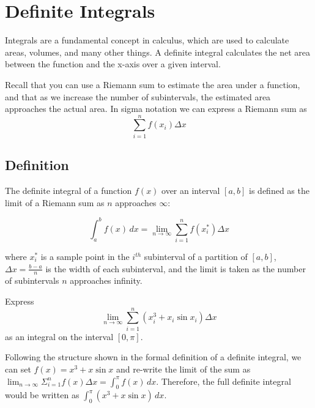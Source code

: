 \chapter{Definite Integrals}

Integrals are a fundamental concept in calculus, which are used to
calculate areas, volumes, and many other things. A definite integral
calculates the net area between the function and the x-axis over a
given interval.

Recall that you can use a Riemann sum to estimate the area under a 
function, and that as we increase the number of subintervals, the 
estimated area approaches the actual area. In sigma notation we can 
express a Riemann sum as $$\sum_{i=1}^{n} f(x_i)\Delta x$$

\section{Definition}

The definite integral of a function $f(x)$ over an interval $[a, b]$
is defined as the limit of a Riemann sum as $n$ approaches $\infty$:

\begin{equation}
\int_{a}^{b} f(x) \, dx = \lim_{{n \to \infty}} \sum_{i=1}^{n} 
f(x_i^*) \Delta x
\end{equation}

where $x_i^*$ is a sample point in the $i^{th}$ subinterval of a
partition of $[a, b]$, $\Delta x = \frac{b-a}{n}$ is the width of each
subinterval, and the limit is taken as the number of subintervals $n$
approaches infinity.

\begin{Exercise}[label=defint1]
Express $$\lim_{n \to \infty} \sum_{i=1}^{n} (x_i^3 + x_i\sin{x_i})
\Delta x$$ as an integral on the interval $[0, \pi]$. 
\end{Exercise}

\begin{Answer}[ref=defint1]
Following the structure shown in the formal definition of a definite 
integral, we can set $f(x) = x^3 + x\sin{x}$ and re-write the limit of 
the sum as $\lim_{n \to \infty} \Sigma_{i=1}^{n} f(x)\Delta x = 
\int_{0}^{\pi} f(x)\,dx$. Therefore, the full definite integral 
would be written as $\int_{0}^{\pi} (x^3 + x\sin{x})\, dx$. 
\end{Answer}

